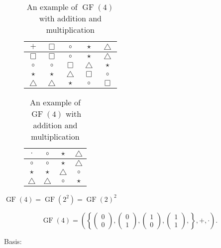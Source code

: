 \documentclass{article}
\newcommand{\GF}{\operatorname{GF}}
\begin{document}
\begin{table}[h]
    \centering
    \begin{subfigure}[b]{.25\textwidth}
        \begin{tabular}{c|cccc}
            $+$ & $\Box$ & $\circ$ & $\star$ & $\bigtriangleup$ \\ \hline
            $\Box$ & $\Box$ & $\circ$ & $\star$ & $\bigtriangleup$ \\
            $\circ$ & $\circ$ & $\Box$ & $\bigtriangleup$ & $\star$ \\
            $\star$ & $\star$ & $\bigtriangleup$ & $\Box$ & $\circ$ \\
            $\bigtriangleup$ & $\bigtriangleup$ & $\star$ & $\circ$ & $\Box$
        \end{tabular}
    \end{subfigure}
    \begin{subfigure}[b]{.25\textwidth}
        \begin{tabular}{c|ccc}
            $\cdot$ & $\circ$ & $\star$ & $\bigtriangleup$ \\ \hline
            $\circ$ & $\circ$ & $\star$ & $\bigtriangleup$ \\
            $\star$ & $\star$ & $\bigtriangleup$ & $\circ$ \\
            $\bigtriangleup$ & $\bigtriangleup$ & $\circ$ & $\star$
        \end{tabular}
    \end{subfigure}
    \caption{An example of $\GF(4)$ with addition and multiplication}
    \label{tab:gf4examplesymb}
\end{table}

$\GF(4) = \GF(2^2) = \GF(2)^2$

\[\GF(4) = \left( \left\{
    \begin{pmatrix} 0 \\ 0 \end{pmatrix},
    \begin{pmatrix} 0 \\ 1 \end{pmatrix},
    \begin{pmatrix} 1 \\ 0 \end{pmatrix},
    \begin{pmatrix} 1 \\ 1 \end{pmatrix},
\right\}, +, \cdot \right). \]

Basis:
\end{document}
